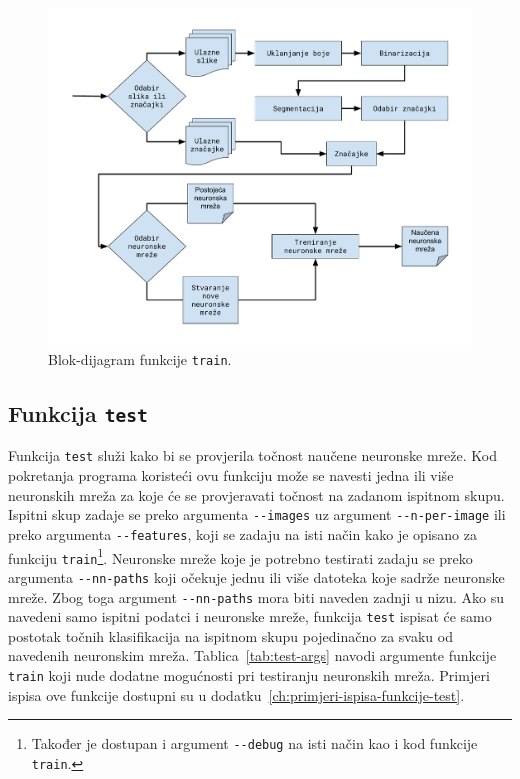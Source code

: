 \begin{figure}[!htb]
    \centering
    \includegraphics[width=12cm]{images/chapter4/train-diagram.pdf}
    \caption{Blok-dijagram funkcije \texttt{train}.}
    \label{fig:train-diagram}
\end{figure}
\newpage

\subsection{Funkcija \texttt{test}}
\label{subsec:funkcija-test}
Funkcija \texttt{test} služi kako bi se provjerila točnost naučene neuronske mreže. Kod pokretanja programa koristeći
ovu funkciju može se navesti jedna ili više neuronskih mreža za koje će se provjeravati točnost na zadanom ispitnom
skupu. Ispitni skup zadaje se preko argumenta \texttt{-{}-images} uz argument \texttt{-{}-n-per-image} ili preko
argumenta \texttt{-{}-features}, koji se zadaju na isti način kako je opisano za funkciju \texttt{train}\footnote{
Također je dostupan i argument \texttt{-{}-debug} na isti način kao i kod funkcije \texttt{train}.}. Neuronske mreže
koje je potrebno testirati zadaju se preko argumenta \texttt{-{}-nn-paths} koji očekuje jednu ili više datoteka koje
sadrže neuronske mreže. Zbog toga argument \texttt{-{}-nn-paths} mora biti naveden zadnji u nizu. Ako su navedeni samo
ispitni podatci i neuronske mreže, funkcija \texttt{test} ispisat će samo postotak točnih klasifikacija na ispitnom
skupu pojedinačno za svaku od navedenih neuronskim mreža. Tablica\ \ref{tab:test-args} navodi argumente funkcije
\texttt{train} koji nude dodatne mogućnosti pri testiranju neuronskih mreža. Primjeri ispisa ove funkcije dostupni su u
dodatku\ \ref{ch:primjeri-ispisa-funkcije-test}.

